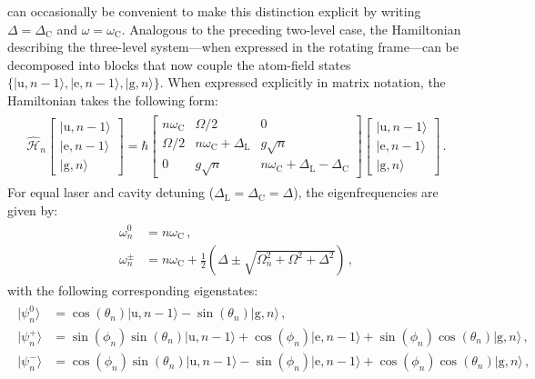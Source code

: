 \documentclass[../Thesis-IJspeert.tex]{subfiles}
\begin{document}
can occasionally be convenient to make this distinction explicit by writing $\Delta=\Delta_\mathrm{C}$ and $\omega=\omega_\mathrm{C}$. Analogous to the preceding two-level case, the Hamiltonian describing the three-level system---when expressed in the rotating frame---can be decomposed into blocks that now couple the atom-field states $\{\vert \mathrm{u}, n-1 \rangle,  \vert \mathrm{e},n-1\rangle, \vert \mathrm{g}, n\rangle\}$. When expressed explicitly in matrix notation, the Hamiltonian takes the following form:
\vspace{1em}
\begin{align}
\label{hamiltonianHn}
\begin{split}
\hat{\mathcal{H}}_n \begin{bmatrix}  \vert \mathrm{u}, n-1 \rangle \\ \vert \mathrm{e}, n-1\rangle \\ \vert \mathrm{g}, n\rangle \end{bmatrix} = \hbar \begin{bmatrix} n\omega_\mathrm{C} & \Omega/2 & 0 \\ \Omega/2 & n\omega_\mathrm{C} + \Delta_\mathrm{L} & g\sqrt{n} \\ 0 & g\sqrt{n} &  n\omega_\mathrm{C} + \Delta_\mathrm{L}-\Delta_\mathrm{C} \end{bmatrix} \begin{bmatrix} \vert \mathrm{u}, n-1 \rangle \\ \vert \mathrm{e}, n-1\rangle \\ \vert \mathrm{g}, n\rangle \end{bmatrix}\,.
\end{split}
\end{align}
For equal laser and cavity detuning ($\Delta_\mathrm{L}=\Delta_\mathrm{C}=\Delta$), the eigenfrequencies are given by:
\begin{align}
\begin{split}
\omega_{n}^0 &= n\omega_\mathrm{C}  \,,\\
\omega_{n}^{\pm} &= n\omega_\mathrm{C} + \frac{1}{2} \left(\Delta \pm \sqrt{\Omega_n^2 + \Omega^2 + \Delta^2 } \right)\,,
\label{eq:3lvlTripletEnergies}
\end{split}
\end{align}
with the following corresponding eigenstates:
\begin{align}
\begin{split}
\vert \psi^0_n \rangle &= \cos(\theta_n)\vert \mathrm{u},n-1\rangle - \sin(\theta_n)\vert{\mathrm{g},n}\rangle \,,\\
\vert \psi^+_n \rangle &= \sin(\phi_n)\sin(\theta_n)\vert{\mathrm{u},n-1}\rangle + \cos(\phi_n)\vert{\mathrm{e},n-1}\rangle + \sin(\phi_n)\cos(\theta_n)\vert{\mathrm{g},n}\rangle \,,\\
\vert \psi^-_n \rangle &= \cos(\phi_n)\sin(\theta_n)\vert{\mathrm{u},n-1}\rangle - \sin(\phi_n)\vert{\mathrm{e},n-1}\rangle + \cos(\phi_n)\cos(\theta_n)\vert{\mathrm{g},n}\rangle\,,
\label{eq:3lvlTripletStates}
\end{split}
\end{align}
\end{document}
